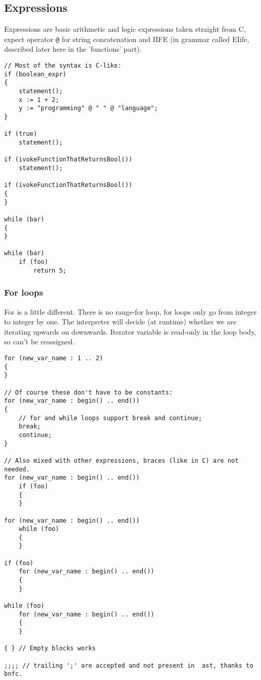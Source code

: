 \documentclass[11pt]{article}
\begin{document}
\subsection*{Expressions}
\label{sec:org1bcdab0}

Expressions are basic arithmetic and logic expressions taken straight from C,
expect operator \texttt{@} for string concatenation and IIFE (in grammar
called EIife, described later here in the 'functions' part).

\begin{verbatim}
// Most of the syntax is C-like:
if (boolean_expr)
{
    statement();
    x := 1 + 2;
    y := "programming" @ " " @ "language";
}

if (true)
    statement();

if (ivokeFunctionThatReturnsBool())
    statement();

if (ivokeFunctionThatReturnsBool())
{
}

while (bar)
{
}

while (bar)
    if (foo)
        return 5;
\end{verbatim}

\subsubsection*{For loops}
\label{sec:org40e33a8}
For is a little different. There is no range-for loop, for loops only go
from integer to integer by one. The interpreter will decide (at runtime)
whether we are iterating upwards on downwards. Iterator variable is
read-only in the loop body, so can't be reassigned.

\begin{verbatim}
for (new_var_name : 1 .. 2)
{
}

// Of course these don't have to be constants:
for (new_var_name : begin() .. end())
{
    // for and while loops support break and continue;
    break;
    continue;
}

// Also mixed with other expressions, braces (like in C) are not needed.
for (new_var_name : begin() .. end())
    if (foo)
    {
    }

for (new_var_name : begin() .. end())
    while (foo)
    {
    }

if (foo)
    for (new_var_name : begin() .. end())
    {
    }

while (foo)
    for (new_var_name : begin() .. end())
    {
    }

{ } // Empty blocks works

;;;; // trailing ';' are accepted and not present in  ast, thanks to bnfc.
\end{verbatim}
\end{document}
